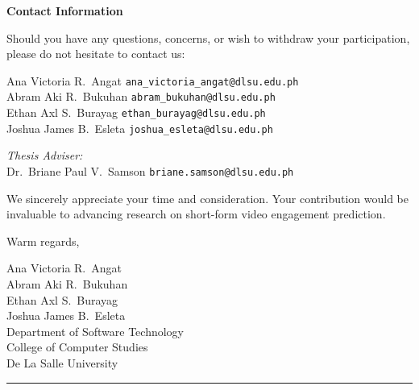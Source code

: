 \noindent\textbf{Contact Information}

Should you have any questions, concerns, or wish to withdraw your participation, please do not hesitate to contact us:

\noindent Ana Victoria R.\ Angat \hfill \texttt{ana\_victoria\_angat@dlsu.edu.ph} \\
Abram Aki R.\ Bukuhan \hfill \texttt{abram\_bukuhan@dlsu.edu.ph} \\
Ethan Axl S.\ Burayag \hfill \texttt{ethan\_burayag@dlsu.edu.ph} \\
Joshua James B.\ Esleta \hfill \texttt{joshua\_esleta@dlsu.edu.ph}

\noindent\textit{Thesis Adviser:} \\
Dr.\ Briane Paul V.\ Samson \hfill \texttt{briane.samson@dlsu.edu.ph}

\noindent We sincerely appreciate your time and consideration. Your contribution would be invaluable to advancing research on short-form video engagement prediction.

\noindent Warm regards,

\noindent Ana Victoria R.\ Angat \\
Abram Aki R.\ Bukuhan \\
Ethan Axl S.\ Burayag \\
Joshua James B.\ Esleta \\
Department of Software Technology \\
College of Computer Studies \\
De La Salle University

\noindent\rule{\textwidth}{0.4pt}